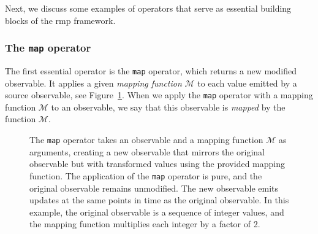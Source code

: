 Next, we discuss some examples of operators that serve as essential building blocks of the
\ac{rmp} framework.

\subsubsection{The \texttt{map} operator}

The first essential operator is the \texttt{map} operator, which returns a new modified
observable.
It applies a given \textit{mapping function} $\mathcal{M}$ to each value emitted by a source
observable, see Figure~\ref{fig:rmp:reactive_operator_map}.
When we apply the \texttt{map} operator with a mapping function $\mathcal{M}$ to an
observable, we say that this observable is \textit{mapped} by the function $\mathcal{M}$.


\begin{figure}
  \centering
  \resizebox{\textwidth}{!}{}
  \caption{The \texttt{map} operator takes an observable and a mapping function $\mathcal{M}$ as arguments, creating a new observable that mirrors the original observable but with transformed values using the provided mapping function.
    The application of the \texttt{map} operator is pure, and the original observable remains
    unmodified.
    The new observable emits updates at the same points in time as the original observable.
    In this example, the original observable is a sequence of integer values, and the mapping
    function multiplies each integer by a factor of 2.
  }
  \label{fig:rmp:reactive_operator_map}
\end{figure}


